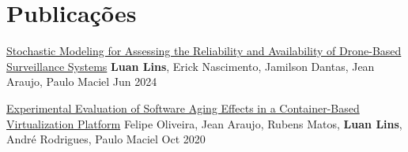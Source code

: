 \section{Publicações}
\resumeSubHeadingListStart

\resumePubliSubheading
{\href{https://doi.org/10.1109/SysCon61195.2024.10553470}{Stochastic Modeling for Assessing the Reliability and Availability of Drone-Based Surveillance Systems}}
{\textbf{Luan Lins}, Erick Nascimento, Jamilson Dantas, Jean Araujo, Paulo Maciel}
{Jun 2024}


\resumePubliSubheading
{\href{https://doi.org/10.1109/SMC42975.2020.9283358}{Experimental Evaluation of Software Aging Effects in a Container-Based Virtualization Platform}}
{Felipe Oliveira, Jean Araujo, Rubens Matos, \textbf{Luan Lins}, André Rodrigues, Paulo Maciel}
{Oct 2020}


\resumeSubHeadingListEnd